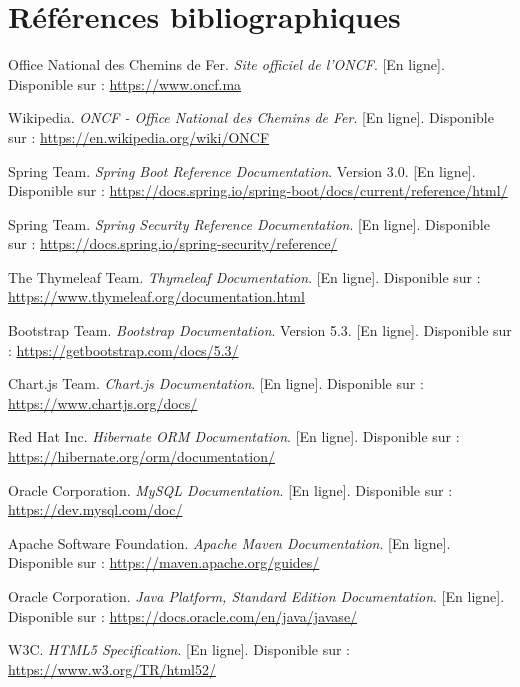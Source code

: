 \chapter*{Références bibliographiques}

\begin{thebibliography}{20}

Office National des Chemins de Fer. \textit{Site officiel de l'ONCF}. [En ligne]. Disponible sur : \url{https://www.oncf.ma}

Wikipedia. \textit{ONCF - Office National des Chemins de Fer}. [En ligne]. Disponible sur : \url{https://en.wikipedia.org/wiki/ONCF}

Spring Team. \textit{Spring Boot Reference Documentation}. Version 3.0. [En ligne]. Disponible sur : \url{https://docs.spring.io/spring-boot/docs/current/reference/html/}

Spring Team. \textit{Spring Security Reference Documentation}. [En ligne]. Disponible sur : \url{https://docs.spring.io/spring-security/reference/}

The Thymeleaf Team. \textit{Thymeleaf Documentation}. [En ligne]. Disponible sur : \url{https://www.thymeleaf.org/documentation.html}

Bootstrap Team. \textit{Bootstrap Documentation}. Version 5.3. [En ligne]. Disponible sur : \url{https://getbootstrap.com/docs/5.3/}

Chart.js Team. \textit{Chart.js Documentation}. [En ligne]. Disponible sur : \url{https://www.chartjs.org/docs/}

Red Hat Inc. \textit{Hibernate ORM Documentation}. [En ligne]. Disponible sur : \url{https://hibernate.org/orm/documentation/}

Oracle Corporation. \textit{MySQL Documentation}. [En ligne]. Disponible sur : \url{https://dev.mysql.com/doc/}

Apache Software Foundation. \textit{Apache Maven Documentation}. [En ligne]. Disponible sur : \url{https://maven.apache.org/guides/}

Oracle Corporation. \textit{Java Platform, Standard Edition Documentation}. [En ligne]. Disponible sur : \url{https://docs.oracle.com/en/java/javase/}

W3C. \textit{HTML5 Specification}. [En ligne]. Disponible sur : \url{https://www.w3.org/TR/html52/}


\end{thebibliography}
